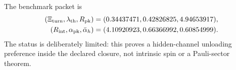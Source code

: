 The benchmark packet is
\begin{equation}
\label{eq:app-part08-stage249-benchmark-packet}
\begin{aligned}
(\Xi_{\rm turn},\lambda_{\rm th},R_{\rm pk})
&=
(0.34437471,0.42826825,4.94653917),\\
(R_{\rm int},\alpha_{\rm pk},\bar\alpha_h)
&=
(4.10920923,0.66366992,0.60854999).
\end{aligned}
\end{equation}
The status is deliberately limited: this proves a hidden-channel unloading preference inside the declared closure, not intrinsic spin or a Pauli-sector theorem.
